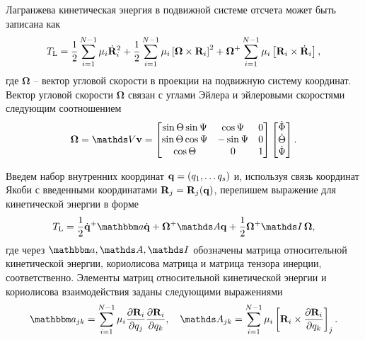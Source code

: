 Лагранжева кинетическая энергия в подвижной системе отсчета может быть записана как \cite{landau-volume1}
\begin{gather}
    T_\text{L} = \frac{1}{2} \sum_{i = 1}^{N-1} \mu_i \dot{\mathbf{R}}_i^2 + \frac{1}{2} \sum_{i = 1}^{N - 1} \mu_i \left[ \boldsymbol{\Omega} \times \mathbf{R}_i \right]^2 + \boldsymbol{\Omega}^{+} \sum_{i = 1}^{N - 1} \mu_i \left[ \mathbf{R}_i \times \dot{\mathbf{R}}_i \right],
\end{gather}
%
где $\boldsymbol{\Omega}$ -- вектор угловой скорости в проекции на подвижную систему координат. Вектор угловой скорости $\boldsymbol{\Omega}$ связан с углами Эйлера и эйлеровыми скоростями следующим соотношением
\begin{gather}
    \boldsymbol{\Omega} = \bbV \mf{v} = 
    \begin{bmatrix}
        \sin \Theta \sin \Psi & \cos \Psi & 0 \\
        \sin \Theta \cos \Psi & -\sin \Psi & 0 \\
        \cos \Theta & 0 & 1 
    \end{bmatrix}
    \begin{bmatrix}
        \dot{\Phi} \\ \dot{\Theta} \\ \dot{\Psi}
    \end{bmatrix}.
\end{gather}

Введем набор внутренних координат $\mathbf{q} = \left( q_1, \dots q_s \right)$ и, используя связь координат Якоби с введенными координатами $\mathbf{R}_j = \mathbf{R}_j(\mathbf{q})$, перепишем выражение для кинетической энергии в форме \cite{petrov2015}
\begin{gather}
    \Tl = \frac{1}{2} \dot{\mf{q}}^+ \bba \dot{\mf{q}} + \bOmega^+ \bbA \mf{q} + \frac{1}{2} \bOmega^+ \bbI \, \bOmega, \label{body-fixed-lagrange-energy} 
\end{gather}
%
где через $\bba, \bbA, \bbI$ обозначены матрица относительной кинетической энергии, кориолисова матрица и матрица тензора инерции, соответственно. Элементы матриц относительной кинетической энергии и кориолисова взаимодействия заданы следующими выражениями
\begin{gather}
    \bba_{jk} = \sum_{i = 1}^{N - 1} \mu_i \frac{\partial \mf{R}_i}{\partial q_j} \frac{\partial \mf{R}_i}{\partial q_k}, \quad \bbA_{jk} = \sum_{i = 1}^{N - 1} \mu_i \lsq \mf{R}_i \times \frac{\partial \mf{R}_i}{\partial q_k} \rsq_j. \label{polyatom-kinetic-energy-matrices}
\end{gather}

